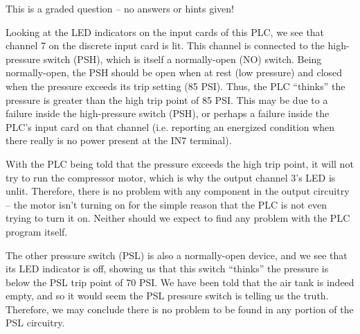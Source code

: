 \vfil 

\eject






This is a graded question -- no answers or hints given!







Looking at the LED indicators on the input cards of this PLC, we see that channel 7 on the discrete input card is lit.  This channel is connected to the high-pressure switch (PSH), which is itself a normally-open (NO) switch.  Being normally-open, the PSH should be open when at rest (low pressure) and closed when the pressure exceeds its trip setting (85 PSI).  Thus, the PLC ``thinks'' the pressure is greater than the high trip point of 85 PSI.  This may be due to a failure inside the high-pressure switch (PSH), or perhaps a failure inside the PLC's input card on that channel (i.e. reporting an energized condition when there really is no power present at the IN7 terminal).

\vskip 10pt

With the PLC being told that the pressure exceeds the high trip point, it will not try to run the compressor motor, which is why the output channel 3's LED is unlit.  Therefore, there is no problem with any component in the output circuitry -- the motor isn't turning on for the simple reason that the PLC is not even trying to turn it on.  Neither should we expect to find any problem with the PLC program itself.

\vskip 10pt

The other pressure switch (PSL) is also a normally-open device, and we see that its LED indicator is off, showing us that this switch ``thinks'' the pressure is below the PSL trip point of 70 PSI.  We have been told that the air tank is indeed empty, and so it would seem the PSL pressure switch is telling us the truth.  Therefore, we may conclude there is no problem to be found in any portion of the PSL circuitry.


